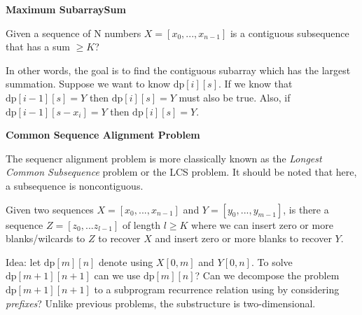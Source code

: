 
\frmrule


\textbf{Maximum SubarraySum} 

Given a sequence of N numbers $X = [x_0, ... ,x_{n-1}]$ 
is a contiguous subsequence that has a sum $\geqslant K$?

In other words, the goal is to find the contiguous subarray which has 
the largest summation. Suppose we want to know $\text{dp}[i][s]$. 
If we know that $\text{dp}[i-1][s] = Y$ then $\text{dp}[i][s] = Y$ must also be true. 
Also, if $\text{dp}[i-1][s-x_i] = Y$ then $\text{dp}[i][s] = Y$. 

\frmrule


\textbf{Common Sequence Alignment Problem} 

The sequencr alignment problem is more classically known as 
the \textit{Longest Common Subsequence} problem or the LCS problem. 
It should be noted that here, a subsequence is noncontiguous. 


Given two sequences $X = [x_0, ... ,x_{n-1}]$ and 
$Y = [y_0, ... ,y_{m-1}]$, is there a sequence $Z = [z_0, ... z_{l-1}]$ 
of length $l \geqslant K$ where we can insert zero or more blanks/wilcards to $Z$ to recover $X$ 
and insert zero or more blanks to recover $Y$.

Idea: let $\text{dp}[m][n]$ denote using $X[0,m]$ and $Y[0,n]$. 
To solve $\text{dp}[m+1][n+1]$ can we use $\text{dp}[m][n]$? 
Can we decompose the problem $\text{dp}[m+1][n+1]$ 
to a subprogram recurrence relation using by considering \textit{prefixes}? Unlike 
previous problems, the substructure is two-dimensional. 


\begin{figure}[h]
\end{figure} 


